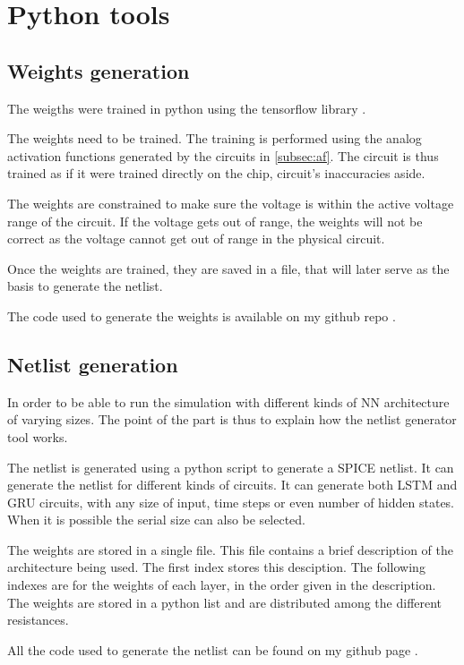 \section{Python tools}

\subsection{Weights generation}

The weigths were trained in python \cite{python} using the tensorflow library \cite{tensorflow}.

The weights need to be trained. The training is performed using the analog activation functions generated by the circuits in \cref{subsec:af}. The circuit is thus trained as if it were trained directly on the chip, circuit's inaccuracies aside.

The weights are constrained to make sure the voltage is within the active voltage range of the circuit. If the voltage gets out of range, the weights will not be correct as the voltage cannot get out of range in the physical circuit.

Once the weights are trained, they are saved in a file, that will later serve as the basis to generate the netlist.

The code used to generate the weights is available on my github repo \cite{lstmWei}.

\subsection{Netlist generation}

In order to be able to run the simulation with different kinds of \ac{NN} architecture of varying sizes. The point of the part is thus to explain how the netlist generator tool works.

The netlist is generated using a python script to generate a SPICE netlist. It can generate the netlist for different kinds of circuits. It can generate both LSTM and GRU circuits, with any size of input, time steps or even number of hidden states. When it is possible the serial size can also be selected.

The weights are stored in a single file. This file contains a brief description of the architecture being used. The first index stores this desciption. The following indexes are for the weights of each layer, in the order given in the description. The weights are stored in a python list and are distributed among the different resistances.

All the code used to generate the netlist can be found on my github page \cite{lstmGen}.
